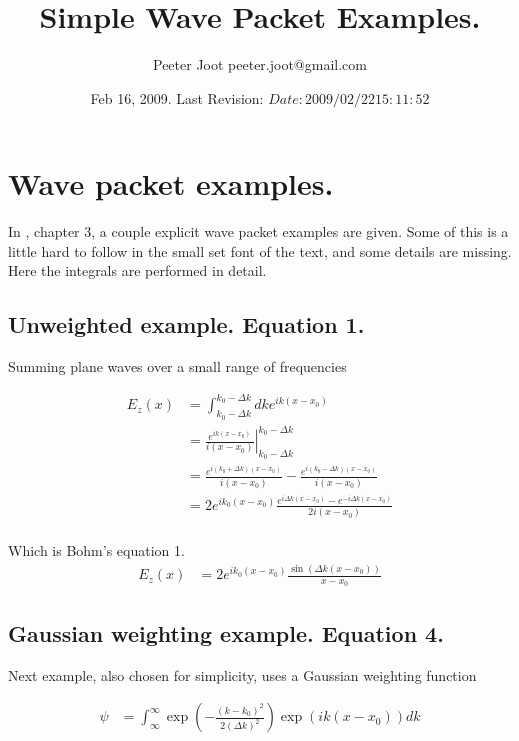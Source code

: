 \documentclass{article}
\title{ Simple Wave Packet Examples. }
\author{Peeter Joot \quad peeter.joot@gmail.com}
\date{ Feb 16, 2009.  Last Revision: $Date: 2009/02/22 15:11:52 $ }
\begin{document}
\maketitle{}
\section{ Wave packet examples. }

In \cite{bohm1989qt}, chapter 3, a couple explicit wave packet examples are given.
Some of this is a little hard to follow in the small set font of the text, and some details are missing.  Here the integrals are performed
in detail.

\subsection{ Unweighted example. Equation 1. }

Summing plane waves over a small range of frequencies

\begin{align*}
E_z(x) 
&= \int_{k_0 -\Delta k}^{k_0 -\Delta k} dk e^{ik(x-x_0)} \\
&= {\left. \frac{e^{ik(x-x_0)}}{i(x-x_0)} \right\vert}_{k_0 -\Delta k}^{k_0 -\Delta k}  \\
&= \frac{e^{i(k_0 + \Delta k)(x-x_0)}}{i(x-x_0)} -\frac{e^{i(k_0 - \Delta k)(x-x_0)}}{i(x-x_0)} \\
&= 2 {e^{i k_0 (x-x_0)}}
 \frac{{e^{i \Delta k(x-x_0)}} -{e^{-i \Delta k(x-x_0)}}}{2 i (x-x_0)} \\
\end{align*}

Which is Bohm's equation 1.
\begin{align*}
E_z(x) &= 2 {e^{i k_0 (x-x_0)}} \frac{\sin( \Delta k (x-x_0))}{ x-x_0}
\end{align*}

\subsection{ Gaussian weighting example. Equation 4. }

Next example, also chosen for simplicity, uses a Gaussian weighting function

\begin{align*}
\psi 
&= \int_\infty^\infty 
\exp\left( - \frac{(k-k_0)^2}{2(\Delta k)^2} \right)
\exp\left( i k(x-x_0) \right) dk \\
\end{align*}
\end{document}
